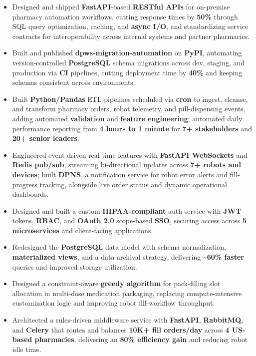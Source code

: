 \begin{itemize}
  \item Designed and shipped \textbf{FastAPI}-based \textbf{RESTful APIs} for on-premise pharmacy automation workflows, cutting response times by \textbf{50\%} through SQL query optimization, caching, and \textbf{async I/O}, and standardizing service contracts for interoperability across internal systems and partner pharmacies.
  \item Built and published \textbf{dpws-migration-automation} on \textbf{PyPI}, automating version-controlled \textbf{PostgreSQL} schema migrations across dev, staging, and production via \textbf{CI} pipelines, cutting deployment time by \textbf{40\%} and keeping schemas consistent across environments.
  \item Built \textbf{Python/Pandas} ETL pipelines scheduled via \textbf{cron} to ingest, cleanse, and transform pharmacy orders, robot telemetry, and pill-dispensing events, adding automated \textbf{validation} and \textbf{feature engineering}; automated daily performance reporting from \textbf{4 hours to 1 minute} for \textbf{7+ stakeholders} and \textbf{20+ senior leaders}.
  \item Engineered event-driven real-time features with \textbf{FastAPI WebSockets} and \textbf{Redis pub/sub}, streaming bi-directional updates across \textbf{7+ robots and devices}; built \textbf{DPNS}, a notification service for robot error alerts and fill-progress tracking, alongside live order status and dynamic operational dashboards.
  \item Designed and built a custom \textbf{HIPAA-compliant} auth service with \textbf{JWT} tokens, \textbf{RBAC}, and \textbf{OAuth 2.0} scope-based \textbf{SSO}, securing access across \textbf{5 microservices} and client-facing applications.
  \item Redesigned the \textbf{PostgreSQL} data model with schema normalization, \textbf{materialized views}, and a data archival strategy, delivering \textbf{\textasciitilde{}60\% faster} queries and improved storage utilization.
  \item Designed a constraint-aware \textbf{greedy algorithm} for pack-filling slot allocation in multi-dose medication packaging, replacing compute-intensive customization logic and improving robot fill-workflow throughput.
  \item Architected a rules-driven middleware service with \textbf{FastAPI}, \textbf{RabbitMQ}, and \textbf{Celery} that routes and balances \textbf{10K+ fill orders/day} across \textbf{4 US-based pharmacies}, delivering an \textbf{80\% efficiency gain} and reducing robot idle time.
\end{itemize}
